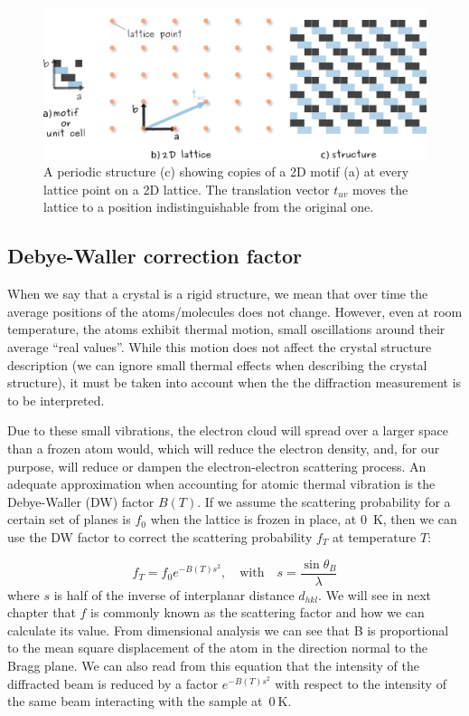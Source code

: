 \begin{figure}[ht]
    \centering
\includegraphics[width=0.9\linewidth]{Figures/motif.png}
\caption[2D crystal lattice definition.]{A periodic structure (c) showing copies of a 2D motif (a) at every lattice point on a 2D lattice. The translation vector $t_{uv}$ moves the lattice to a position indistinguishable from the original one.}
\label{Fig:motif}
\end{figure}




\subsection{Debye-Waller correction factor}
\label{Sec:DWf}

When we say that a crystal is a rigid structure, we mean that over time the average positions of the atoms/molecules does not change. However, even at room temperature, the atoms exhibit thermal motion, small oscillations around their average ``real values''. While this motion does not affect the crystal structure description (\ie we can ignore small thermal effects when describing the crystal structure), it must be taken into account when the the diffraction measurement is to be interpreted.

Due to these small vibrations, the electron cloud will spread over a larger space than a frozen atom would, which will reduce the electron density, and, for our purpose, will reduce or dampen the electron-electron scattering process. An adequate approximation when accounting for atomic thermal vibration is the Debye-Waller (DW) factor $B(T)$. If we assume the scattering probability for a certain set of planes is $f_0$ when the lattice is frozen in place, \ie at \SI{0}{\kelvin}, then we can use the DW factor to correct the scattering probability $f_T$ at temperature $T$:

\begin{equation}
\label{eq:correctedScattter}
f_T=f_0 e^{-B(T)s^2}, \quad \text{with}\quad s=\frac{\sin\theta_B}{\lambda}
\end{equation}
where $s$ is half of the inverse of interplanar distance $d_{hkl}$. We will see in next chapter that $f$ is commonly known as the scattering factor and how we can calculate its value. From dimensional analysis we can see that B is proportional to the mean square displacement of the atom in the direction normal to the Bragg plane. We can also read from this equation that the intensity of the diffracted beam is reduced by a factor $e^{-B(T)s^2}$ with respect to the intensity of the same beam interacting with the sample at~$\SI{0}{\kelvin}$.

